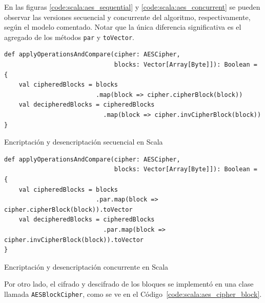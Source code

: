 \documentclass[11pt]{article}
\begin{document}
En las figuras \ref{code:scala:aes_sequential} y \ref{code:scala:aes_concurrent} se pueden observar las versiones secuencial y concurrente del algoritmo, respectivamente, según el modelo comentado. Notar que la única diferencia significativa es el agregado de los métodos \lstinline{par} y \lstinline{toVector}.

\begin{listing}[h]
\begin{verbatim}
def applyOperationsAndCompare(cipher: AESCipher,
                              blocks: Vector[Array[Byte]]): Boolean = {
    val cipheredBlocks = blocks
                         .map(block => cipher.cipherBlock(block))
    val decipheredBlocks = cipheredBlocks
                           .map(block => cipher.invCipherBlock(block))
}
\end{verbatim}
\caption{Encriptación y desencriptación secuencial en Scala}
\label{code:scala:aes_sequential}
\end{listing}


\begin{listing}[h]
\begin{verbatim}
def applyOperationsAndCompare(cipher: AESCipher,
                              blocks: Vector[Array[Byte]]): Boolean = {
    val cipheredBlocks = blocks
                         .par.map(block => cipher.cipherBlock(block)).toVector
    val decipheredBlocks = cipheredBlocks
                           .par.map(block => cipher.invCipherBlock(block)).toVector
}
\end{verbatim}
\caption{Encriptación y desencriptación concurrente en Scala}
\label{code:scala:aes_concurrent}
\end{listing}

Por otro lado, el cifrado y descifrado de los bloques se implementó en una clase llamada \lstinline{AESBlockCipher}, como se ve en el Código~\ref{code:scala:aes_cipher_block}.
\end{document}
